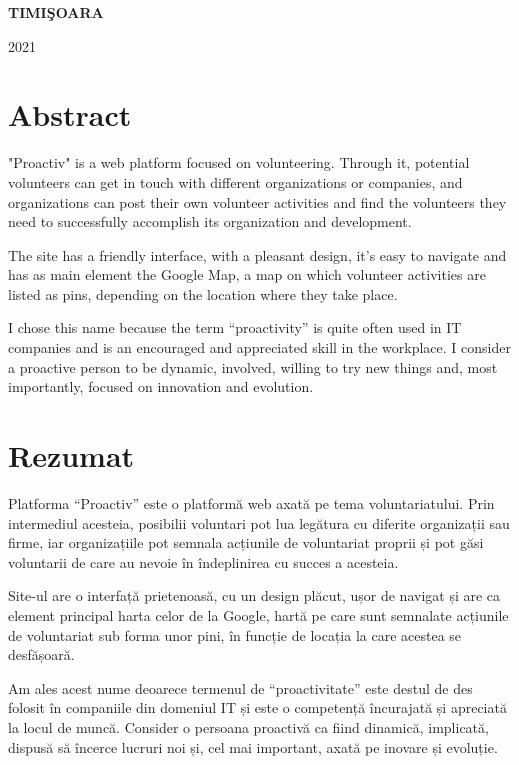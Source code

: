 \documentclass[12pt,a4paper]{report}
\begin{document}
\vfill
\begin{center}
{\bf TIMI\c SOARA

2021}
\end{center}
\newpage
\normalsize{}

\setcounter{page}{2}

\section*{Abstract}
\par
"Proactiv" is a web platform focused on volunteering. Through it, potential volunteers can get in touch with different organizations or companies, and organizations can post their own volunteer activities and find the volunteers they need to successfully accomplish its organization and development.
\\ \par
The site has a friendly interface, with a pleasant design, it's easy to navigate and has as main element the Google Map, a map on which volunteer activities are listed as pins, depending on the location where they take place. 
\\ \par
I chose this name because the term “proactivity” is quite often used in IT companies and is an encouraged and appreciated skill in the workplace. I consider a proactive person to be dynamic, involved, willing to try new things and, most importantly, focused on innovation and evolution.

\newpage
\section*{Rezumat}
\par
Platforma “Proactiv” este o platformă web axată pe tema voluntariatului. Prin intermediul acesteia, posibilii voluntari pot lua legătura cu diferite organizații sau
firme, iar organizațiile pot semnala acțiunile de voluntariat proprii și pot găsi voluntarii de care au nevoie în îndeplinirea cu succes a acesteia.
\\ \par
Site-ul are o interfață prietenoasă, cu un design plăcut, ușor de navigat și are ca element principal harta celor de la Google, hartă pe care sunt semnalate acțiunile de voluntariat sub forma unor pini, în funcție de locația la care acestea se desfășoară.
\\ \par
Am ales acest nume deoarece termenul de “proactivitate” este destul de des folosit în companiile din domeniul IT și este o competență încurajată și apreciată la locul de muncă. Consider o persoana proactivă ca fiind dinamică, implicată, dispusă să încerce lucruri noi și, cel mai important, axată pe inovare și evoluție.
\end{document}

